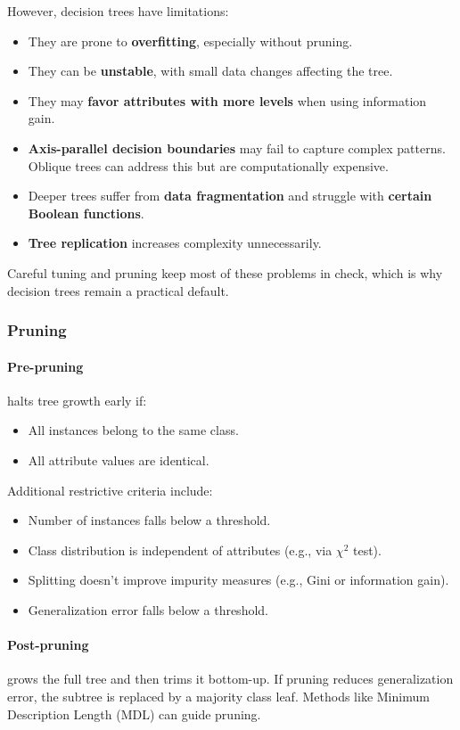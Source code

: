 However, decision trees have limitations:
\begin{itemize}
    \item They are prone to \textbf{overfitting}, especially without pruning.
    \item They can be \textbf{unstable}, with small data changes affecting the tree.
    \item They may \textbf{favor attributes with more levels} when using information gain.
    \item \textbf{Axis-parallel decision boundaries} may fail to capture complex patterns. Oblique trees can address this but are computationally expensive.
    \item Deeper trees suffer from \textbf{data fragmentation} and struggle with \textbf{certain Boolean functions}.
    \item \textbf{Tree replication} increases complexity unnecessarily.
\end{itemize}

Careful tuning and pruning keep most of these problems in check, which is why decision trees remain a practical default.

\subsubsection{Pruning}
\paragraph{Pre-pruning} halts tree growth early if:
\begin{itemize}
    \item All instances belong to the same class.
    \item All attribute values are identical.
\end{itemize}
Additional restrictive criteria include:
\begin{itemize}
    \item Number of instances falls below a threshold.
    \item Class distribution is independent of attributes (e.g., via $\chi^2$ test).
    \item Splitting doesn't improve impurity measures (e.g., Gini or information gain).
    \item Generalization error falls below a threshold.
\end{itemize}

\paragraph{Post-pruning} grows the full tree and then trims it bottom-up. If pruning reduces generalization error, the subtree is replaced by a majority class leaf. Methods like Minimum Description Length (MDL) can guide pruning.

